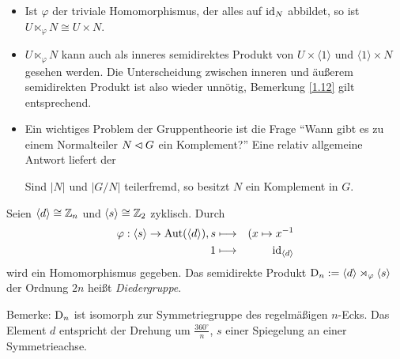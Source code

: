 \begin{bemerkung}\spspace
{}
 \begin{itemize}
 \item Ist $\varphi$ der triviale Homomorphismus, der alles auf $\operatorname{id}_N$ abbildet, so ist $U \ltimes_\varphi N\cong U\times N$.
 \item $U \ltimes_\varphi N$ kann auch als inneres semidirektes Produkt von $U\times \langle 1 \rangle$ und $\langle 1 \rangle \times N$ gesehen werden. Die Unterscheidung zwischen inneren und \"au\ss{}erem semidirekten Produkt ist also wieder unn\"otig, Bemerkung \ref{1.12} gilt entsprechend.
 \item Ein wichtiges Problem der Gruppentheorie ist die Frage ``Wann gibt es zu einem Normalteiler $N \lhd G$ ein Komplement?'' Eine relativ allgemeine Antwort liefert der 
\begin{satz*} 
 Sind $|N|$ und $|G/N|$ teilerfremd, so besitzt $N$ ein Komplement in $G$.
\end{satz*}

\end{itemize}

\end{bemerkung}

\begin{beispiel}
 Seien $\langle d \rangle \cong \mathbb{Z}_n$ und $\langle s \rangle \cong \mathbb{Z}_2$ zyklisch. Durch 
\begin{eqnarray*}
\varphi:\langle s \rangle \to \operatorname{Aut}(\langle d \rangle ), s&\longmapsto&(x\mapsto x^{-1}\\ 1 &\longmapsto& \operatorname{id}_{\langle d \rangle}
\end{eqnarray*}
wird ein Homomorphismus gegeben. Das semidirekte Produkt $\operatorname{D}_n:=\langle d \rangle \rtimes_\varphi \langle s \rangle$ der Ordnung $2n$ hei\ss{}t \emph{Diedergruppe}.

Bemerke: $\operatorname{D}_n$ ist isomorph zur Symmetriegruppe des regelm\"a\ss{}igen $n$-Ecks. Das Element $d$ entspricht der Drehung um $\frac{360^\circ}{n}$, $s$ einer Spiegelung an einer Symmetrieachse.

\end{beispiel}

